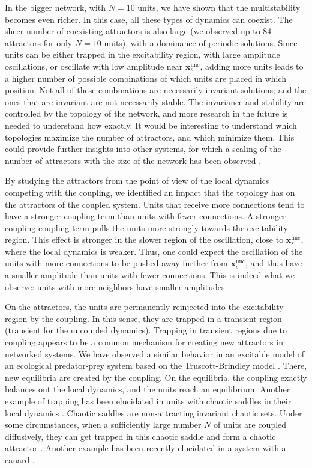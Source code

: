 In the bigger network, with $N=10$ units, we have shown that the multistability becomes even richer. In this case, all these types of dynamics can coexist. The sheer number of coexisting attractors is also large (we observed up to 84 attractors for only $N=10$ units), with a dominance of periodic solutions. Since units can be either trapped in the excitability region, with large amplitude oscillations, or oscillate with low amplitude near $\mathbf{x}_s^\mathrm{unc}$, adding more units leads to a higher number of possible combinations of which units are placed in which position. Not all of these combinations are necessarily invariant solutions; and the ones that are invariant are not necessarily stable. The invariance and stability are controlled by the topology of the network, and more research in the future is needed to understand how exactly. It would be interesting to understand which topologies maximize the number of attractors, and which minimize them. This could provide further insights into other systems, for which a scaling of the number of attractors with the size of the network has been observed \cite{ullner2007multistability, rossi2022shifts, gelbrecht2020monte}.

By studying the attractors from the point of view of the local dynamics competing with the coupling, we identified an impact that the topology has on the attractors of the coupled system. Units that receive more connections tend to have a stronger coupling term than units with fewer connections. A stronger coupling coupling term pulls the units more strongly towards the excitability region. This effect is stronger in the slower region of the oscillation, close to $\mathbf{x}_s^\mathrm{unc}$, where the local dynamics is weaker. Thus, one could expect the oscillation of the units with more connections to be pushed away further from $\mathbf{x}_s^\mathrm{unc}$, and thus have a smaller amplitude than units with fewer connections. This is indeed what we observe: units with more neighbors have smaller amplitudes.

On the attractors, the units are permanently reinjected into the excitability region by the coupling. In this sense, they are trapped in a transient region (transient for the uncoupled dynamics). Trapping in transient regions due to coupling appears to be a common mechanism for creating new attractors in networked systems. We have observed a similar behavior in an excitable model of an ecological predator-prey system based on the Truscott-Brindley model \cite{truscott1984ocean}. There, new equilibria are created by the coupling. On the equilibria, the coupling exactly balances out the local dynamics, and the units reach an equilibrium. Another example of trapping has been elucidated in units with chaotic saddles in their local dynamics \cite{medeiros2018boundaries, medeiros2019state, medeiros2021the}. Chaotic saddles are non-attracting invariant chaotic sets. Under some circumstances, when a sufficiently large number $N$ of units are coupled diffusively, they can get trapped in this chaotic saddle and form a chaotic attractor \cite{medeiros2018boundaries, medeiros2019state}.  Another example has been recently elucidated in a system with a canard \cite{contreras2023scale}. 

